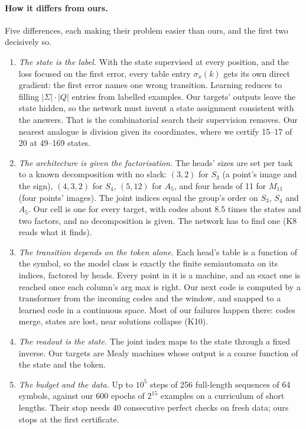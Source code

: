 \documentclass[11pt]{article}
\begin{document}
\paragraph{How it differs from ours.} Five differences, each making their problem easier than
ours, and the first two decisively so.
\begin{enumerate}
\item \emph{The state is the label.} With the state supervised at every position, and the loss
  focused on the first error, every table entry $\sigma_x(k)$ gets its own direct gradient: the
  first error names one wrong transition. Learning reduces to filling $|\Sigma| \cdot |Q|$ entries
  from labelled examples. Our targets' outputs leave the state hidden, so the network must invent a
  state assignment consistent with the answers. That is the combinatorial search their supervision
  removes. Our nearest analogue is division given its coordinates, where we certify 15--17 of 20
  at 49--169 states.
\item \emph{The architecture is given the factorisation.} The heads' sizes are set per task to a
  known decomposition with no slack: $(3, 2)$ for $S_3$ (a point's image and the sign), $(4, 3, 2)$
  for $S_4$, $(5, 12)$ for $A_5$, and four heads of 11 for $M_{11}$ (four points' images). The joint
  indices equal the group's order on $S_3$, $S_4$ and $A_5$. Our cell is one for every target, with
  codes about 8.5 times the states and two factors, and no decomposition is given. The network has
  to find one (K8 reads what it finds).
\item \emph{The transition depends on the token alone.} Each head's table is a function of the
  symbol, so the model class is exactly the finite semiautomata on its indices, factored by heads.
  Every point in it is a machine, and an exact one is reached once each column's arg max is right.
  Our next code is computed by a transformer from the incoming codes and the window, and snapped to
  a learned code in a continuous space. Most of our failures happen there: codes merge, states are
  lost, near solutions collapse (K10).
\item \emph{The readout is the state.} The joint index maps to the state through a fixed inverse.
  Our targets are Mealy machines whose output is a coarse function of the state and the token.
\item \emph{The budget and the data.} Up to $10^5$ steps of 256 full-length sequences of 64 symbols,
  against our 600 epochs of $2^{15}$ examples on a curriculum of short lengths. Their stop needs 40
  consecutive perfect checks on fresh data; ours stops at the first certificate.
\end{enumerate}
\end{document}
